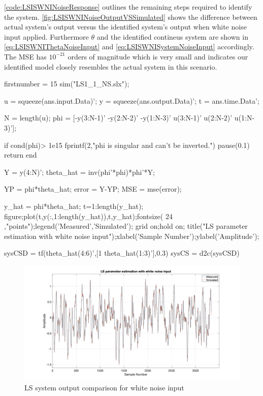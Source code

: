 \autoref{code:LSISWNINoiseResponse} outlines the remaining steps required to identify the system. \autoref{fig:LSISWNINoiseOutputVSSimulated} shows the difference between actual system's output versus the identified system's output when white noise input applied. Furthermore $\theta$ and the identified contineus system are shown in \autoref{eq:LSISWNIThetaNoiseInput} and \autoref{eq:LSISWNISystemNoiseInput} accordingly. The MSE has  $10^{-21}$ orders of magnitude which is very small and indicates our identified model closely resembles the actual system in this scenario.

\begin{code}
	\begin{matlabcode}{firstnumber = 15}
sim("LS1_1_NS.slx");

u = squeeze(ans.input.Data)';
y = squeeze(ans.output.Data)';
t = ans.time.Data';

N = length(u);
phi = [-y(3:N-1)' -y(2:N-2)' -y(1:N-3)' u(3:N-1)' u(2:N-2)' u(1:N-3)'];

if cond(phi)> 1e15
fprintf(2,"phi is singular and can't be inverted.\n")
pause(0.1)
return
end   

Y = y(4:N)';
theta_hat = inv(phi'*phi)*phi'*Y;

YP = phi*theta_hat;
error = Y-YP;
MSE = mse(error);

y_hat = phi*theta_hat;
t=1:length(y_hat);
figure;plot(t,y(:,1:length(y_hat)),t,y_hat);fontsize( 24 ,"points");legend('Measured','Simulated');
grid on;hold on;
title("LS parameter estimation with white noise input");xlabel('Sample Number');ylabel('Amplitude');

sysCSD = tf(theta_hat(4:6)',[1 theta_hat(1:3)'],0.3)
sysCS = d2c(sysCSD)
	\end{matlabcode}
	\label{code:LSISWNINoiseResponse}
\end{code}

\begin{figure}
	\centering
	\includegraphics[width=\textwidth]{images/LSISWNINoiseOutputVSSimulated.png}
	\caption{LS system output comparison for white noise input}
	\label{fig:LSISWNINoiseOutputVSSimulated}
\end{figure}

